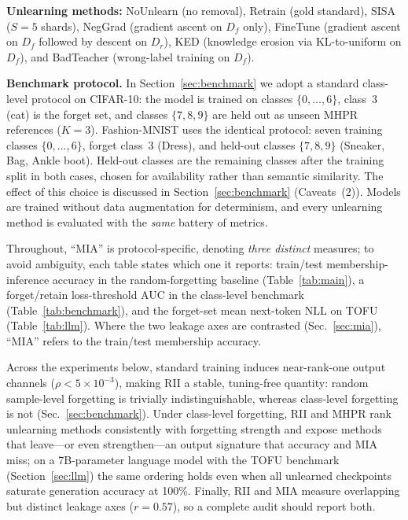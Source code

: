 \documentclass[smallextended]{svjour3}       %
\begin{document}
\textbf{Unlearning methods:} NoUnlearn (no removal), Retrain (gold standard), SISA~\cite{bourtoule2021machine} ($S{=}5$ shards), NegGrad (gradient ascent on $D_f$ only), FineTune (gradient ascent on $D_f$ followed by descent on $D_r$), KED (knowledge erosion via KL-to-uniform on $D_f$), and BadTeacher (wrong-label training on $D_f$).

\textbf{Benchmark protocol.} In Section~\ref{sec:benchmark} we adopt a standard class-level protocol on CIFAR-10: the model is trained on classes $\{0,\dots,6\}$, class~3 (cat) is the forget set, and classes $\{7,8,9\}$ are held out as unseen MHPR references ($K{=}3$). Fashion-MNIST uses the identical protocol: seven training classes $\{0,\dots,6\}$, forget class~3 (Dress), and held-out classes $\{7,8,9\}$ (Sneaker, Bag, Ankle boot). Held-out classes are the remaining classes after the training split in both cases, chosen for availability rather than semantic similarity. The effect of this choice is discussed in Section~\ref{sec:benchmark} (Caveats~(2)). Models are trained without data augmentation for determinism, and every unlearning method is evaluated with the \emph{same} battery of metrics.

Throughout, ``MIA'' is protocol-specific, denoting \emph{three distinct} measures; to avoid ambiguity, each table states which one it reports: train/test membership-inference accuracy in the random-forgetting baseline (Table~\ref{tab:main}), a forget/retain loss-threshold AUC in the class-level benchmark (Table~\ref{tab:benchmark}), and the forget-set mean next-token NLL on TOFU (Table~\ref{tab:llm}). Where the two leakage axes are contrasted (Sec.~\ref{sec:mia}), ``MIA'' refers to the train/test membership accuracy.

Across the experiments below, standard training induces near-rank-one output channels ($\rho<5\times10^{-3}$), making RII a stable, tuning-free quantity: random sample-level forgetting is trivially indistinguishable, whereas class-level forgetting is not (Sec.~\ref{sec:benchmark}). Under class-level forgetting, RII and MHPR rank unlearning methods consistently with forgetting strength and expose methods that leave---or even strengthen---an output signature that accuracy and MIA miss; on a 7B-parameter language model with the TOFU benchmark (Section~\ref{sec:llm}) the same ordering holds even when all unlearned checkpoints saturate generation accuracy at 100\%. Finally, RII and MIA measure overlapping but distinct leakage axes ($r{=}0.57$), so a complete audit should report both.
\end{document}
